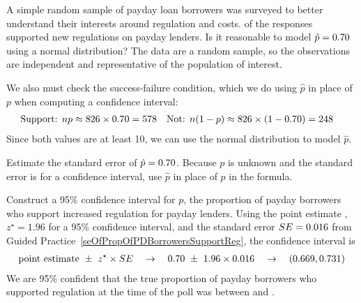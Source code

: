 \begin{examplewrap}
\begin{nexample}{A simple random sample of \paydayN{}
    payday loan borrowers was surveyed to better
    understand their interests around regulation and costs.
    \paydayRegPerc{} of the responses supported new
    regulations on payday lenders.
    Is it reasonable to model $\hat{p} = 0.70{}$
    using a normal distribution?}
  The data are a random sample, so the observations are
  independent and representative of the population of
  interest.

  We also must check the success-failure condition,
  which we do using $\hat{p}$ in place
  of $p$ when computing a confidence interval:
  \begin{align*}
  \text{Support: }
      n p &
          \approx 826{} \times 0.70{}
      = 578
  &\text{Not: }
      n (1 - p) &
        \approx 826{} \times (1 - 0.70{})
      = 248
  \end{align*}
  Since both values are at least 10, we can use the normal
  distribution to model $\hat{p}$.
\end{nexample}
\end{examplewrap}




\begin{exercisewrap}
\begin{nexercise} \label{seOfPropOfPDBorrowersSupportReg}
Estimate the standard error of $\hat{p} = 0.70{}$.
Because $p$ is unknown and the standard error is for
a confidence interval, use $\hat{p}$ in place of $p$
in the formula.\footnotemark
\end{nexercise}
\end{exercisewrap}

\begin{examplewrap}
\begin{nexample}{Construct a 95\% confidence interval for $p$,
    the proportion of payday borrowers who support increased
    regulation for payday lenders.}
  Using
  the point estimate \paydayRegProp{},
  $z^{\star} = 1.96$ for a 95\% confidence interval,
  and
  the standard error $SE = 0.016{}$ from
  Guided Practice~\ref{seOfPropOfPDBorrowersSupportReg},
  the confidence interval is
  \begin{eqnarray*}
  \text{point estimate} \ \pm\ z^{\star} \times SE
      \quad\to\quad
      0.70{} \ \pm\ 1.96 \times 0.016{}
      \quad\to\quad
      (0.669{}, 0.731{})
  \end{eqnarray*}
  We are 95\% confident that the true proportion of
  payday borrowers who supported regulation at the time
  of the poll was between \paydayRegLower{} and
  \paydayRegUpper{}.
\end{nexample}
\end{examplewrap}


